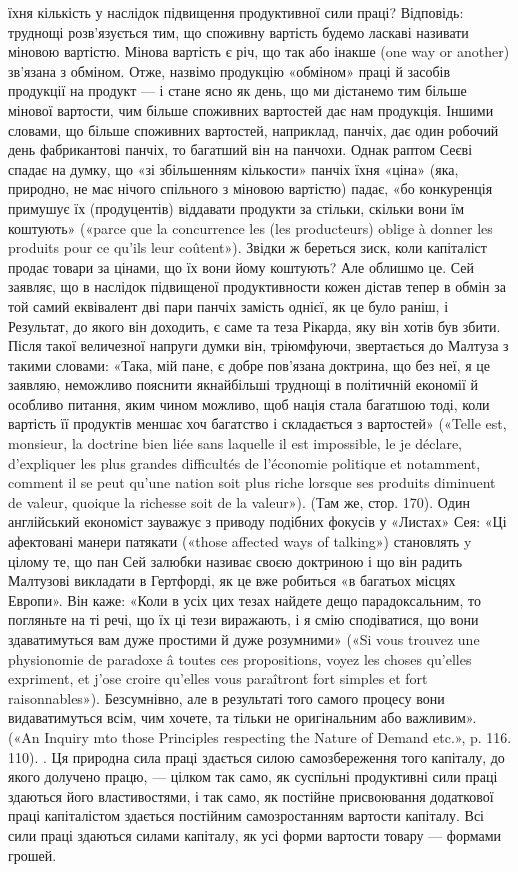 {їхня кількість у наслідок підвищення продуктивної сили праці? Відповідь:
труднощі розв’язується тим, що споживну вартість будемо ласкаві
називати міновою вартістю. Мінова вартість є річ, що так або інакше
(one way or another) зв’язана з обміном. Отже, назвімо продукцію «обміном»
праці й засобів продукції на продукт — і стане ясно як день, що
ми дістанемо тим більше мінової вартости, чим більше споживних вартостей
дає нам продукція. Іншими словами, що більше споживних вартостей,
наприклад, панчіх, дає один робочий день фабрикантові панчіх,
то багатший він на панчохи. Однак раптом Сеєві спадає на думку, що «зі
збільшенням кількости» панчіх їхня «ціна» (яка, природно, не має нічого
спільного з міновою вартістю) падає, «бо конкуренція примушує їх (продуцентів)
віддавати продукти за стільки, скільки вони їм коштують»
(«parce que la concurrence les (les producteurs) oblige à donner les produits
pour ce qu’ils leur coûtent»). Звідки ж береться зиск, коли капіталіст
продає товари за цінами, що їх вони йому коштують? Але облишмо
це. Сей заявляє, що в наслідок підвищеної продуктивности кожен дістав
тепер в обмін за той самий еквівалент дві пари панчіх замість однієї, як
це було раніш, і~ Результат, до якого він доходить, є саме та теза
Рікарда, яку він хотів був збити. Після такої величезної напруги думки
він, тріюмфуючи, звертається до Малтуза з такими словами: «Така, мій
пане, є добре пов’язана доктрина, що без неї, я це заявляю, неможливо
пояснити якнайбільші труднощі в політичній економії й особливо питання,
яким чином можливо, щоб нація стала багатшою тоді, коли вартість її
продуктів меншає хоч багатство і складається з вартостей» («Telle est,
monsieur, la doctrine bien liée sans laquelle il est impossible, le je déclare,
d’expliquer les plus grandes difficultés de l’économie politique et notamment,
comment il se peut qu’une nation soit plus riche lorsque ses produits
diminuent de valeur, quoique la richesse soit de la valeur»). (Там же, стор.
170). Один англійський економіст зауважує з приводу подібних фокусів
у «Листах» Сея: «Ці афектовані манери патякати («those affected ways
of talking») становлять y цілому те, що пан Сей залюбки називає своєю
доктриною і що він радить Малтузові викладати в Гертфорді, як це вже
робиться «в багатьох місцях Европи». Він каже: «Коли в усіх цих тезах
найдете дещо парадоксальним, то погляньте на ті речі, що їх ці тези виражають,
і я смію сподіватися, що вони здаватимуться вам дуже простими
й дуже розумними» («Si vous trouvez une physionomie de paradoxe â
toutes ces propositions, voyez les choses qu’elles expriment, et j’ose croire
qu’elles vous paraîtront fort simples et fort raisonnables»). Безсумнівно,
але в результаті того самого процесу вони видаватимуться всім, чим хочете,
та тільки не оригінальним або важливим». («An Inquiry mto those
Principles respecting the Nature of Demand etc.», p. 116. 110).
}. Ця природна сила праці здається силою самозбереження
того капіталу, до якого долучено працю, — цілком так само,
як суспільні продуктивні сили праці здаються його властивостями,
і так само, як постійне присвоювання додаткової праці
капіталістом здається постійним самозростанням вартости капіталу.
Всі сили праці здаються силами капіталу, як усі форми
вартости товару — формами грошей.

